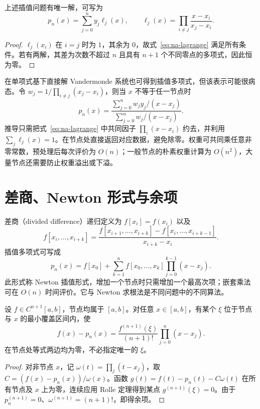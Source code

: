 \documentclass[UTF8,12pt,a4paper,fontset=fandol]{ctexbook}
\begin{document}
\begin{theorem}[多项式插值的存在唯一性]
上述插值问题有唯一解，可写为
\begin{equation}
 p_n(x)=\sum_{j=0}^ny_j\ell_j(x),\qquad
 \ell_j(x)=\prod_{i\ne j}\frac{x-x_i}{x_j-x_i}.
 \label{eq:na-lagrange}
\end{equation}
\end{theorem}
\begin{proof}
$\ell_j(x_i)$ 在 $i=j$ 时为 $1$，其余为 $0$，故式~\eqref{eq:na-lagrange} 满足所有条件。若有两解，其差为次数不超过 $n$ 且具有 $n+1$ 个不同零点的多项式，因此恒为零。
\end{proof}

在单项式基下直接解 Vandermonde 系统也可得到插值多项式，但该表示可能很病态。令 $w_j=1/\prod_{i\ne j}(x_j-x_i)$，则当 $x$ 不等于任一节点时
\begin{equation}
 p_n(x)=\frac{\sum_{j=0}^n w_jy_j/(x-x_j)}{\sum_{j=0}^n w_j/(x-x_j)}.
 \label{eq:na-barycentric}
\end{equation}
推导只需把式~\eqref{eq:na-lagrange} 中共同因子 $\prod_i(x-x_i)$ 约去，并利用 $\sum_j\ell_j(x)=1$。在节点处直接返回对应数据，避免除零。权重可共同乘任意非零常数，预处理后每次评价为 $O(n)$；一般节点的朴素权重计算为 $O(n^2)$，大量节点还需要防止权重溢出或下溢。

\section{差商、Newton 形式与余项}
差商（divided difference）递归定义为 $f[x_i]=f(x_i)$ 以及
\[
 f[x_i,\ldots,x_{i+k}]=
 \frac{f[x_{i+1},\ldots,x_{i+k}]-f[x_i,\ldots,x_{i+k-1}]}{x_{i+k}-x_i}.
\]
插值多项式可写成
\[
 p_n(x)=f[x_0]+\sum_{k=1}^nf[x_0,\ldots,x_k]\prod_{j=0}^{k-1}(x-x_j).
\]
此形式称 Newton 插值形式，增加一个节点时只需增加一个最高次项；嵌套乘法可在 $O(n)$ 时间评价。它与 Newton 求根法是不同问题中的不同算法。

\begin{theorem}[插值余项]
\label{thm:na-interpolation-error}
设 $f\in C^{n+1}[a,b]$，节点均属于 $[a,b]$。对任意 $x\in[a,b]$，有某个 $\xi$ 位于节点与 $x$ 的最小覆盖区间内，使
\begin{equation}
 f(x)-p_n(x)=\frac{f^{(n+1)}(\xi)}{(n+1)!}\prod_{j=0}^n(x-x_j).
 \label{eq:na-interpolation-error}
\end{equation}
在节点处等式两边均为零，不必指定唯一的 $\xi$。
\end{theorem}
\begin{proof}
对非节点 $x$，记 $\omega(t)=\prod_j(t-x_j)$，取 $C=(f(x)-p_n(x))/\omega(x)$。函数 $g(t)=f(t)-p_n(t)-C\omega(t)$ 在所有节点及 $x$ 上为零，连续应用 Rolle 定理得到某点 $g^{(n+1)}(\xi)=0$。由于 $p_n^{(n+1)}=0$、$\omega^{(n+1)}=(n+1)!$，即得余项。
\end{proof}
\end{document}
